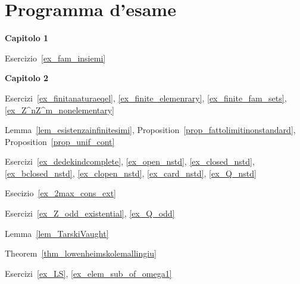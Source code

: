 \chapter*{Programma d'esame}\label{esame}

\textbf{Capitolo 1}

Esercizio~\ref{ex_fam_insiemi} 

\textbf{Capitolo 2}

Esercizi~\ref{ex_finitanaturaeqel}, \ref{ex_finite_elemenrary}, \ref{ex_finite_fam_sets}, \ref{ex_Z^nZ^m_nonelementary}

Lemma~\ref{lem_esistenzainfinitesimi}, Proposition~\ref{prop_fattolimitinonstandard}, Proposition~\ref{prop_unif_cont}

Esercizi~\ref{ex_dedekindcomplete}, \ref{ex_open_nstd}, \ref{ex_closed_nstd}, \ref{ex_bclosed_nstd}, \ref{ex_clopen_nstd}, \ref{ex_card_nstd}, \ref{ex_Q_nstd}

Esecizio~\ref{ex_2max_cons_ext}

Esercizi~\ref{ex_Z_odd_existential}, \ref{ex_Q_odd}

Lemma~\ref{lem_TarskiVaught}

Theorem~\ref{thm_lowenheimskolemallingiu}

Esercizi~\ref{ex_LS}, \ref{ex_elem_sub_of_omega1}